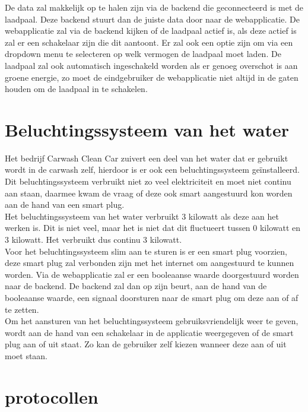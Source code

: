 De data zal makkelijk op te halen zijn via de backend die geconnecteerd is met de laadpaal. Deze backend stuurt dan de juiste data door naar de webapplicatie. De webapplicatie zal via de backend kijken of de laadpaal actief is, als deze actief is zal er een schakelaar zijn die dit aantoont. Er zal ook een optie zijn om via een dropdown menu te selecteren op welk vermogen de laadpaal moet laden. De laadpaal zal ook automatisch ingeschakeld worden als er genoeg overschot is aan groene energie, zo moet de eindgebruiker de webapplicatie niet altijd in de gaten houden om de laadpaal in te schakelen.

\section{Beluchtingssysteem van het water}
\label{sec:stand-van-zaken-beluchtingssysteem}

Het bedrijf Carwash Clean Car zuivert een deel van het water dat er gebruikt wordt in de carwash zelf, hierdoor is er ook een beluchtingssysteem geïnstalleerd. Dit beluchtingssysteem verbruikt niet zo veel elektriciteit en moet niet continu aan staan, daarmee kwam de vraag of deze ook smart aangestuurd kon worden aan de hand van een smart plug.\\

Het beluchtingssysteem van het water verbruikt 3 kilowatt als deze aan het werken is. Dit is niet veel, maar het is niet dat dit fluctueert tussen 0 kilowatt en 3 kilowatt. Het verbruikt dus continu 3 kilowatt.\\

Voor het beluchtingssysteem slim aan te sturen is er een smart plug voorzien, deze smart plug zal verbonden zijn met het internet om aangestuurd te kunnen worden. Via de webapplicatie zal er een booleaanse waarde doorgestuurd worden naar de backend. De backend zal dan op zijn beurt, aan de hand van de booleaanse waarde, een signaal doorsturen naar de smart plug om deze aan of af te zetten.\\

Om het aansturen van het beluchtingssysteem gebruiksvriendelijk weer te geven, wordt aan de hand van een schakelaar in de applicatie weergegeven of de smart plug aan of uit staat. Zo kan de gebruiker zelf kiezen wanneer deze aan of uit moet staan.

\section{protocollen}
\label{sec:stand-van-zaken-protocollen}

